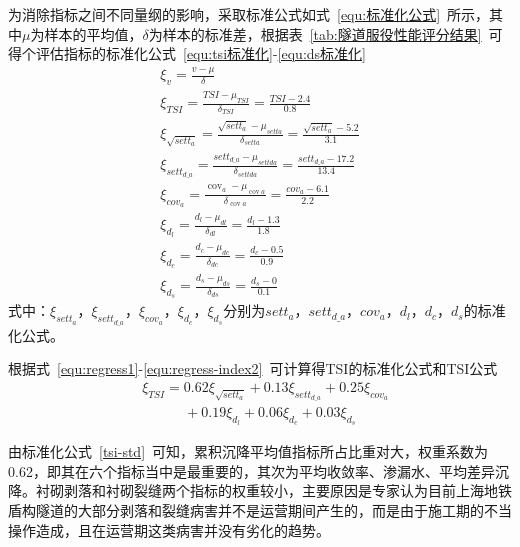 为消除指标之间不同量纲的影响，采取标准公式如式~\ref{equ:标准化公式}~所示，其中$\mu$为样本的平均值，$\delta$为样本的标准差，根据表~\ref{tab:隧道服役性能评分结果}~可得个评估指标的标准化公式~\ref{equ:tsi标准化}-\ref{equ:ds标准化}
\begin{gather}
 \label{equ:标准化公式} 
    {\xi }_{v}=\frac{v-\mu }{\delta }\\
  \label{equ:tsi标准化}
    {\xi }_{TSI}=\frac{TSI-{{\mu }_{TSI}}}{{{\delta }_{TSI}}}=\frac{TSI-2.4}{0.8} \\ 
  \label{equ:setta标准化}
    {\xi }_{\sqrt{set{{{{t}}}_{a}}}}=\frac{\sqrt{set{{t}_{a}}}-{{\mu }_{setta}}}{{{\delta }_{setta}}}=\frac{\sqrt{set{{t}_{a}}}-5.2}{3.1} \\ 
 \label{equ:settda标准化}
    {\xi }_{set{{{{t}}}_{d\_a}}}=\frac{set{{t}_{d\_a}}-{{\mu }_{settda}}}{{{\delta }_{settda}}}=\frac{set{{t}_{d\_a}}-17.2}{13.4} \\ 
 \label{equ:cova标准化}
    {\xi }_{cov_a}=\frac{{{\operatorname{cov}}_{a}}-{{\mu }_{\operatorname{cov}a}}}{{{\delta }_{\operatorname{cov}a}}}=\frac{{cov_a}-6.1}{2.2} \\ 
 \label{equ:dl标准化}
    {\xi }_{{{{d}}}_{l}}=\frac{{{d}_{l}}-{{\mu }_{dl}}}{{{\delta }_{dl}}}=\frac{{{d}_{l}}-1.3}{1.8} \\ 
 \label{equ:dc标准化}
    {\xi }_{{{{d}}}_{c}}=\frac{{{d}_{c}}-{{\mu }_{dc}}}{{{\delta }_{dc}}}=\frac{{{d}_{c}}-0.5}{0.9} \\ 
 \label{equ:ds标准化}
    {\xi }_{{{{d}}}_{s}}=\frac{{{d}_{s}}-{{\mu }_{ds}}}{{{\delta }_{ds}}}=\frac{{{d}_{s}}-0}{0.1}
\end{gather}
式中：${\xi }_{set{{{{t}}}_{a}}}$，${\xi }_{set{{{t}}_{d\_a}}}$，${\xi }_{cov_a}$，${\xi }_{{d}_{c}}$，${\xi }_{{{d}}_{s}}$分别为${set{{t}_{a}}}$，$set{{t}_{d\_a}}$，${cov_a}$，${{d}_{l}}$，${{d}_{c}}$，${{d}_{s}}$的标准化公式。

根据式~\ref{equ:regress1}-\ref{equ:regress-index2}~可计算得TSI的标准化公式和TSI公式
\begin{align}
  \label{tsi-std}
  & {\xi }_{TSI}=0.62{\xi }_{\sqrt{set{{{{t}}}_{a}}}}+0.13{\xi }_{set{{{{t}}}_{d\_a}}}+0.25{\xi }_{cov_a} \\ 
 & \quad \quad \quad +0.19{\xi }_{{{{d}}}_{l}}+0.06{\xi }_{{d}_{c}}+0.03{\xi }_{{{{d}}}_{s}} \nonumber
\end{align}

由标准化公式~\ref{tsi-std}~可知，累积沉降平均值指标所占比重对大，权重系数为0.62，即其在六个指标当中是最重要的，其次为平均收敛率、渗漏水、平均差异沉降。衬砌剥落和衬砌裂缝两个指标的权重较小，主要原因是专家认为目前上海地铁盾构隧道的大部分剥落和裂缝病害并不是运营期间产生的，而是由于施工期的不当操作造成，且在运营期这类病害并没有劣化的趋势。

